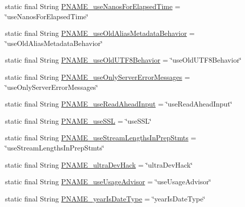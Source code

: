 \begin{DoxyCompactItemize}
\item 
static final String \mbox{\hyperlink{classcom_1_1mysql_1_1cj_1_1conf_1_1_property_definitions_a423fbd8b33eb02f26cd76a3c82b893fe}{P\+N\+A\+M\+E\+\_\+use\+Nanos\+For\+Elapsed\+Time}} = \char`\"{}use\+Nanos\+For\+Elapsed\+Time\char`\"{}
\item 
static final String \mbox{\hyperlink{classcom_1_1mysql_1_1cj_1_1conf_1_1_property_definitions_aaf52418324fad422904ee54c6e70c0bb}{P\+N\+A\+M\+E\+\_\+use\+Old\+Alias\+Metadata\+Behavior}} = \char`\"{}use\+Old\+Alias\+Metadata\+Behavior\char`\"{}
\item 
static final String \mbox{\hyperlink{classcom_1_1mysql_1_1cj_1_1conf_1_1_property_definitions_a58a48459697e56f88bf42a1c492b6413}{P\+N\+A\+M\+E\+\_\+use\+Old\+U\+T\+F8\+Behavior}} = \char`\"{}use\+Old\+U\+T\+F8\+Behavior\char`\"{}
\item 
static final String \mbox{\hyperlink{classcom_1_1mysql_1_1cj_1_1conf_1_1_property_definitions_a9d8fc737592a2dffc8b76ca1eeed50d8}{P\+N\+A\+M\+E\+\_\+use\+Only\+Server\+Error\+Messages}} = \char`\"{}use\+Only\+Server\+Error\+Messages\char`\"{}
\item 
static final String \mbox{\hyperlink{classcom_1_1mysql_1_1cj_1_1conf_1_1_property_definitions_a3dfb3bbe3e3dfdeeea020c208ca1d435}{P\+N\+A\+M\+E\+\_\+use\+Read\+Ahead\+Input}} = \char`\"{}use\+Read\+Ahead\+Input\char`\"{}
\item 
static final String \mbox{\hyperlink{classcom_1_1mysql_1_1cj_1_1conf_1_1_property_definitions_a848763119938ab0f1f784bc418326ddb}{P\+N\+A\+M\+E\+\_\+use\+S\+SL}} = \char`\"{}use\+S\+SL\char`\"{}
\item 
static final String \mbox{\hyperlink{classcom_1_1mysql_1_1cj_1_1conf_1_1_property_definitions_a78c3db89bfbd0147b66396880c618853}{P\+N\+A\+M\+E\+\_\+use\+Stream\+Lengths\+In\+Prep\+Stmts}} = \char`\"{}use\+Stream\+Lengths\+In\+Prep\+Stmts\char`\"{}
\item 
static final String \mbox{\hyperlink{classcom_1_1mysql_1_1cj_1_1conf_1_1_property_definitions_a68febc0be2317249b93b0245af754987}{P\+N\+A\+M\+E\+\_\+ultra\+Dev\+Hack}} = \char`\"{}ultra\+Dev\+Hack\char`\"{}
\item 
static final String \mbox{\hyperlink{classcom_1_1mysql_1_1cj_1_1conf_1_1_property_definitions_ac2e03a82b16638a5545727d4bf3e551b}{P\+N\+A\+M\+E\+\_\+use\+Usage\+Advisor}} = \char`\"{}use\+Usage\+Advisor\char`\"{}
\item 
static final String \mbox{\hyperlink{classcom_1_1mysql_1_1cj_1_1conf_1_1_property_definitions_a246d58196bb2f56d2b487ef03334284b}{P\+N\+A\+M\+E\+\_\+year\+Is\+Date\+Type}} = \char`\"{}year\+Is\+Date\+Type\char`\"{}

\end{DoxyCompactItemize}
